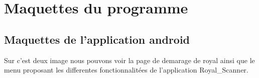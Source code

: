 \section{Maquettes du programme}

\subsection{Maquettes de l'application android}

  \begin{figure}[htbp]
  \begin{center}
    \leavevmode
    \hspace{4cm}
  \end{center}
\end{figure}

Sur c'est deux image nous pouvons voir la page de demarage de royal ainsi que le menu proposant les differentes fonctionnalitées de l'application Royal\_Scanner.


